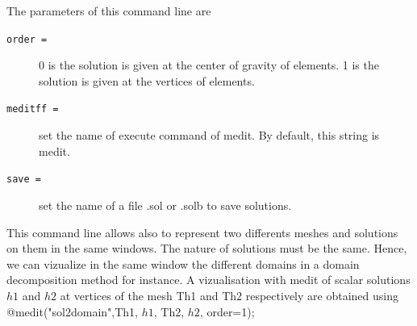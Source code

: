 \documentclass[a4paper,twoside,12pt]{book}
\begin{document}

The parameters of this command line are
\begin{description}
\item [\texttt{order =}] 0 is the solution is given at the center of gravity of elements.
1 is the solution is given at the vertices of elements.
\item [\texttt{meditff =}] set the name of execute command of medit. By default, this string is medit.
\item [\texttt{save =}] set the name of a file .sol or .solb to save solutions.
\end{description}

This command line allows also to represent two differents meshes and solutions on them in the same windows.
The nature of solutions must be the same. Hence, we can vizualize in the same window the different
domains in a domain decomposition method for instance. A vizualisation with medit of scalar solutions $h1$ and $h2$
at vertices of the mesh Th1 and Th2 respectively  are obtained using
\bFF
@medit("sol2domain",Th1, $h1$, Th2, $h2$, order=1);
\eFF
\end{document}
